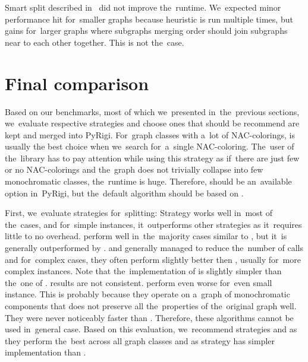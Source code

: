 Smart split described in~
did not improve the~runtime.
We~expected minor performance hit for~smaller graphs because heuristic is run
multiple times, but gains for~larger graphs where subgraphs merging order
should join subgraphs near to each other together. This is not the~case.

\section{Final comparison}

Based on our benchmarks, most of which we~presented in~the~previous sections,
we~evaluate respective strategies and choose ones
that should be recommend are kept and merged into PyRigi.
%
For~graph classes with a~lot of NAC-colorings,
\NaiveCycles{} is usually the best choice
when we~search for~a~single NAC-coloring.
%
The~user of the~library has to pay attention while using this strategy
as if~there are just few or no NAC-colorings and the~graph does not trivially collapse
into few monochromatic classes, the~runtime is huge.
Therefore, \NaiveCycles{} should be an~available option in~PyRigi,
but the~default algorithm should be based on \Subgraphs{}.

First, we~evaluate strategies for~splitting:
Strategy \None{} works well in~most of the~cases, and for~simple
 instances, it~outperforms other strategies as it~requires little to no overhead.
%
\CyclesMatchChunks{} perform well in~the~majority cases similar to \None{},
but it~is generally outperformed by \Neighbors{}.
%
\Neighbors{} and \NeighborsDegree{} generally managed to reduce the~number
of \IsNACColoring{} calls and for~complex cases, they often
perform slightly better then \None{}, usually for~more complex instances.
Note that the~implementation of \Neighbors{} is slightly simpler than
the~one of \NeighborsDegree{}.
%
\KernighanLin{} results are not consistent.
\Cuts{} perform even worse for~even small instance.
This is probably because they operate on a~graph of monochromatic
components that does not preserve all the~properties
of the~original graph well.
They were never noticeably faster than \Neighbors{}.
Therefore, these algorithms cannot be used in~general case.
%
Based on this evaluation, we~recommend strategies \None{} and \Neighbors{}
as they perform the~best across all graph classes and
as \Neighbors{} strategy has simpler implementation than \NeighborsDegree{}.

